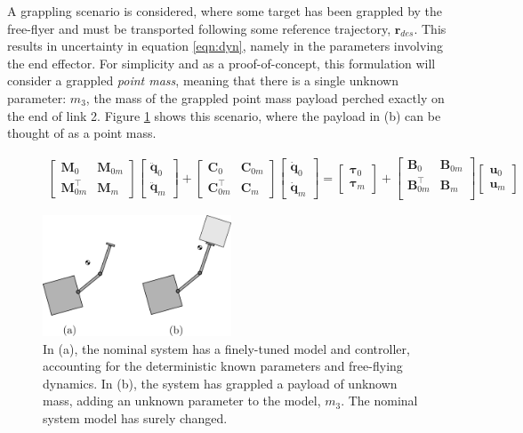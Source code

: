 \documentclass[letterpaper, 10 pt, conference]{ieeeconf}  %
\begin{document}
A grappling scenario is considered, where some target has been grappled by the free-flyer and must be transported following some reference trajectory, $\mathbf{r}_{des}$. This results in uncertainty in equation \ref{eqn:dyn}, namely in the parameters involving the end effector. For simplicity and as a proof-of-concept, this formulation will consider a grappled \textit{point mass}, meaning that there is a single unknown parameter: $m_3$, the mass of the grappled point mass payload perched exactly on the end of link 2. Figure \ref{fig:sys2} shows this scenario, where the payload in (b) can be thought of as a point mass.

\begin{figure}[htb!]
\begin{gather}
\label{eqn:dyn}
\begin{bmatrix} \textbf{M}_0 & \textbf{M}_{0m} \\
\textbf{M}_{0m}^\top & \textbf{M}_{m}\end{bmatrix}
\begin{bmatrix} \ddot{\mathbf{q}}_0 \\ \ddot{\mathbf{q}}_m\end{bmatrix}
+ \begin{bmatrix} \textbf{C}_0 & \textbf{C}_{0m} \\
\textbf{C}_{0m}^\top & \textbf{C}_{m}\end{bmatrix}
\begin{bmatrix} \dot{\mathbf{q}}_0 \\ \dot{\mathbf{q}}_m\end{bmatrix} = \begin{bmatrix} \bm{\tau}_0 \\ \bm{\tau}_m \end{bmatrix} +
\begin{bmatrix} \mathbf{B}_0 & \mathbf{B}_{0m} \\
\mathbf{B}_{0m}^\top & \mathbf{B}_{m} \\
\end{bmatrix} \begin{bmatrix} \mathbf{u}_0 \\ \mathbf{u}_m \end{bmatrix}
\end{gather}
\end{figure}

\begin{figure}[htb!]
	\includegraphics[width=0.5\textwidth]{grappled.png}
	\caption{In (a), the nominal system has a finely-tuned model and controller, accounting for the deterministic known parameters and free-flying dynamics. In (b), the system has grappled a payload of unknown mass, adding an unknown parameter to the model, $m_3$. The nominal system model has surely changed.}
		\label{fig:sys2}
\end{figure}
\end{document}
